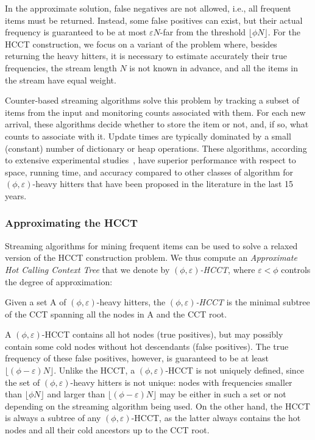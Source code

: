 \noindent In the approximate solution, false negatives are not allowed, i.e., all frequent items must be returned. Instead, some false positives can exist, but their actual frequency is guaranteed to be at most $\varepsilon N$-far from the threshold $\lfloor\phi N\rfloor$. For the HCCT construction, we focus on a variant of the problem where, besides returning the heavy hitters, it is necessary to estimate accurately their true frequencies, the stream length $N$ is not known in advance, and all the items in the stream have equal weight.

Counter-based streaming algorithms solve this problem by tracking a subset of items from the input and monitoring counts associated with them. For each new arrival, these algorithms decide whether to store the item or not, and, if so, what counts to associate with it. Update times are typically dominated by a small (constant) number of dictionary or heap operations. These algorithms, according to extensive experimental studies~\cite{Cormode08,Manerikar2009}, have superior performance with respect to space, running time, and accuracy compared to other classes of algorithm for $(\phi,\varepsilon)$-heavy hitters that have been proposed in the literature in the last 15 years.

\subsubsection*{Approximating the HCCT}
Streaming algorithms for mining frequent items can be used to solve a relaxed version of the HCCT construction problem. We thus compute an {\em Approximate Hot Calling Context Tree} that we denote by {\em $(\phi,\varepsilon)$-HCCT}, where $\varepsilon<\phi$ controls the degree of approximation:

\begin{definition}
Given a set A of $(\phi,\varepsilon)$-heavy hitters, the {\em $(\phi,\varepsilon)$-HCCT} is the minimal subtree of the CCT spanning all the nodes in A and the CCT root.
\end{definition}

\noindent A $(\phi,\varepsilon)$-HCCT contains all hot nodes (true positives), but may possibly contain some cold nodes without hot descendants (false positives). The true frequency of these false positives, however, is guaranteed to be at least $\lfloor(\phi-\varepsilon) N\rfloor$. Unlike the HCCT, a $(\phi,\varepsilon)$-HCCT is not uniquely defined, since the set of $(\phi,\varepsilon)$-heavy hitters is not unique: nodes with frequencies smaller than $\lfloor\phi N\rfloor$ and larger than $\lfloor(\phi-\varepsilon) N\rfloor$ may be either in such a set or not depending on the streaming algorithm being used. On the other hand, the HCCT is always a subtree of any $(\phi,\varepsilon)$-HCCT, as the latter always contains the hot nodes and all their cold ancestors up to the CCT root.

